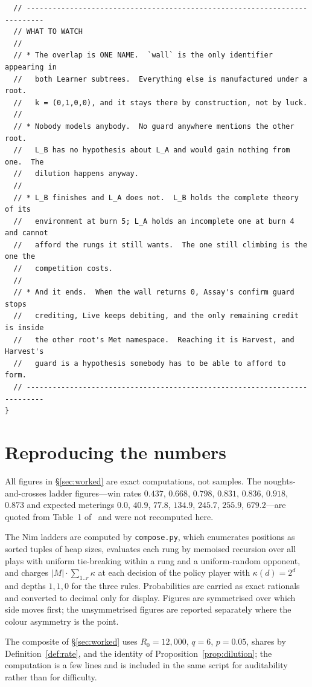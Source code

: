 \documentclass[11pt,a4paper]{article}
\theoremstyle{plain}
\theoremstyle{definition}
\theoremstyle{remark}
\begin{document}
\begin{lstlisting}
  // --------------------------------------------------------------------------
  // WHAT TO WATCH
  //
  // * The overlap is ONE NAME.  `wall` is the only identifier appearing in
  //   both Learner subtrees.  Everything else is manufactured under a root.
  //   k = (0,1,0,0), and it stays there by construction, not by luck.
  //
  // * Nobody models anybody.  No guard anywhere mentions the other root.
  //   L_B has no hypothesis about L_A and would gain nothing from one.  The
  //   dilution happens anyway.
  //
  // * L_B finishes and L_A does not.  L_B holds the complete theory of its
  //   environment at burn 5; L_A holds an incomplete one at burn 4 and cannot
  //   afford the rungs it still wants.  The one still climbing is the one the
  //   competition costs.
  //
  // * And it ends.  When the wall returns 0, Assay's confirm guard stops
  //   crediting, Live keeps debiting, and the only remaining credit is inside
  //   the other root's Met namespace.  Reaching it is Harvest, and Harvest's
  //   guard is a hypothesis somebody has to be able to afford to form.
  // --------------------------------------------------------------------------
}
\end{lstlisting}

\section{Reproducing the numbers}\label{app:repro}

All figures in \S\ref{sec:worked} are exact computations, not samples. The noughts-and-crosses
ladder figures---win rates $0.437$, $0.668$, $0.798$, $0.831$, $0.836$, $0.918$, $0.873$ and
expected meterings $0.0$, $40.9$, $77.8$, $134.9$, $245.7$, $255.9$, $679.2$---are quoted from
Table~1
of~\cite{game} and were not recomputed here.

The Nim ladders are computed by \texttt{compose.py}, which enumerates positions as sorted tuples
of heap sizes, evaluates each rung by memoised recursion over all plays with uniform tie-breaking
within a rung and a uniform-random opponent, and charges $|M| \cdot \sum_{1..r} \kappa$ at each
decision of the policy player with $\kappa(d) = 2^d$ and depths $1, 1, 0$ for the three rules.
Probabilities are carried as exact rationals and converted to decimal only for display. Figures
are symmetrised over which side moves first; the unsymmetrised figures are reported separately
where the colour asymmetry is the point.

The composite of \S\ref{sec:worked} uses $R_0 = 12{,}000$, $q = 6$, $p = 0.05$, shares by
Definition~\ref{def:rate}, and the identity of Proposition~\ref{prop:dilution}; the
computation is a few lines and is included in the same script for auditability rather than for
difficulty.
\end{document}
